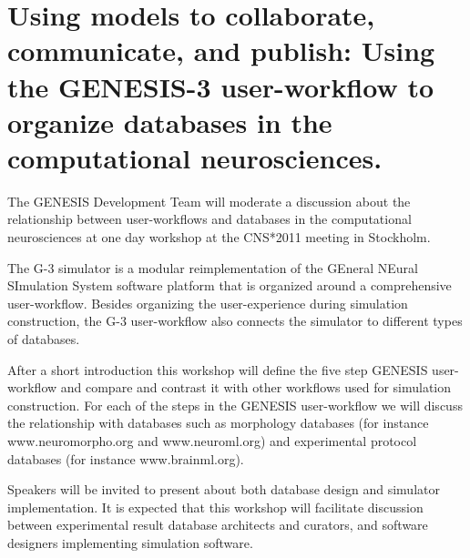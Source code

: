 \documentclass[12pt]{article}
\begin{document}


\section*{Using models to collaborate, communicate, and publish:  Using the GENESIS-3 user-workflow to organize databases in the computational neurosciences.}

The GENESIS Development Team will moderate a discussion about the
relationship between user-workflows and databases in the computational
neurosciences at one day workshop at the CNS*2011 meeting in
Stockholm.

\vspace{3mm}

The G-3 simulator is a modular reimplementation of the GEneral NEural
SImulation System software platform that is organized around a
comprehensive user-workflow.  Besides organizing the user-experience
during simulation construction, the G-3 user-workflow also connects
the simulator to different types of databases.

After a short introduction this workshop will define the five step
GENESIS user-workflow and compare and contrast it with other workflows
used for simulation construction.  For each of the steps in the
GENESIS user-workflow we will discuss the relationship with
databases such as morphology databases (for instance
www.neuromorpho.org and www.neuroml.org) and experimental protocol
databases (for instance www.brainml.org).

Speakers will be invited to present about both database design and
simulator implementation.  It is expected that this workshop will
facilitate discussion between experimental result database architects
and curators, and software designers implementing simulation software.





\end{document}
